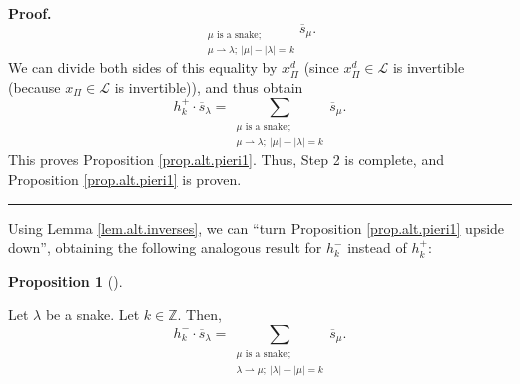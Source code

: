 \documentclass[numbers=enddot,12pt,final,onecolumn,notitlepage]{scrartcl}%
\theoremstyle{definition}
\newtheorem{prop}[theo]{Proposition}
\newenvironment{proposition}[1][]
{\begin{prop}[#1]\begin{leftbar}}
{\end{leftbar}\end{prop}}
\newenvironment{proof}[1][Proof]{\noindent\textbf{#1.} }{\ \rule{0.5em}{0.5em}}
\let\sumnonlimits\sum
\renewcommand{\sum}{\sumnonlimits\limits}
\begin{document}
\begin{proof}
\[_{\substack{\mu\text{ is a snake;}\\\mu\rightharpoonup\lambda;\ \left\vert
\mu\right\vert -\left\vert \lambda\right\vert =k}}\overline{s}_{\mu}.
\]
We can divide both sides of this equality by $x_{\Pi}^{d}$ (since $x_{\Pi}%
^{d}\in\mathcal{L}$ is invertible (because $x_{\Pi}\in\mathcal{L}$ is
invertible)), and thus obtain%
\[
h_{k}^{+}\cdot\overline{s}_{\lambda}=\sum_{\substack{\mu\text{ is a
snake;}\\\mu\rightharpoonup\lambda;\ \left\vert \mu\right\vert -\left\vert
\lambda\right\vert =k}}\overline{s}_{\mu}.
\]
This proves Proposition \ref{prop.alt.pieri1}. Thus, Step 2 is complete, and
Proposition \ref{prop.alt.pieri1} is proven.
\end{proof}

Using Lemma \ref{lem.alt.inverses}, we can \textquotedblleft turn Proposition
\ref{prop.alt.pieri1} upside down\textquotedblright, obtaining the following
analogous result for $h_{k}^{-}$ instead of $h_{k}^{+}$:

\begin{proposition}
\label{prop.alt.pieri2}Let $\lambda$ be a snake. Let $k\in\mathbb{Z}$. Then,%
\begin{equation}
h_{k}^{-}\cdot\overline{s}_{\lambda}=\sum_{\substack{\mu\text{ is a
snake;}\\\lambda\rightharpoonup\mu;\ \left\vert \lambda\right\vert -\left\vert
\mu\right\vert =k}}\overline{s}_{\mu}. \label{eq.prop.alt.pieri2.eq}%
\end{equation}

\end{proposition}
\end{document}
